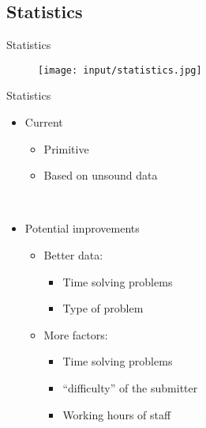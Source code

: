 \subsection{Statistics}
\begin{frame}{Statistics}

\begin{figure}[htbp]
	\begin{center}
	\texttt{[image: input/statistics.jpg]}
	\end{center}
\end{figure}

\end{frame}

\begin{frame}{Statistics}

\begin{itemize}
\item Current
	\begin{itemize}
	\item Primitive
	\item Based on unsound data
	\end{itemize}
\end{itemize}
\\
\begin{itemize}
\item Potential improvements
	\begin{itemize}
	\item Better data:
		\begin{itemize}
		\item Time solving problems
		\item Type of problem
		\end{itemize}
	\item More factors:
		\begin{itemize}
		\item Time solving problems
		\item ``difficulty'' of the submitter
		\item Working hours of staff
		\end{itemize}
	\end{itemize}
\end{itemize}

\end{frame}